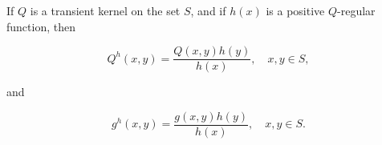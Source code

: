 If $Q$ is a transient kernel on the set $S$, and if $h(x)$ is a positive $Q$-regular function, then

$$Q^h(x,y) = \frac{Q(x,y)h(y)}{h(x)}, \quad x,y \in S,$$

and

$$g^h(x,y) = \frac{g(x,y)h(y)}{h(x)}, \quad x,y \in S.$$